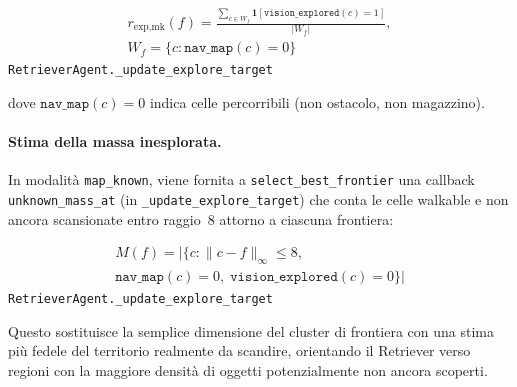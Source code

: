 \begin{multline*}
  r_{\text{exp,mk}}(f) = \frac{\sum_{c \in W_f} \mathbf{1}[\texttt{vision\_explored}(c) = 1]}{|W_f|},\\
  W_f = \{c : \texttt{nav\_map}(c) = 0\}
\end{multline*}
\noindent\hfill{\footnotesize\texttt{RetrieverAgent.\_update\_explore\_target}}

dove $\texttt{nav\_map}(c) = 0$ indica celle percorribili (non ostacolo,
non magazzino).

\begin{sloppypar}
\paragraph{Stima della massa inesplorata.}
In modalit\`a \texttt{map\_known}, viene fornita a
\texttt{select\_best\_fron\-tier}
una callback \texttt{unknown\_mass\_at} (in \texttt{\_update\_explore\_target})
che conta le celle walkable e non ancora
scansionate entro raggio~8 attorno a ciascuna frontiera:
\end{sloppypar}

\begin{multline*}
  M(f) = |\{c : \|c - f\|_\infty \leq 8,\\
  \texttt{nav\_map}(c) = 0,\; \texttt{vision\_explored}(c) = 0\}|
\end{multline*}
\noindent\hfill{\footnotesize\texttt{RetrieverAgent.\_update\_explore\_target}}

Questo sostituisce la semplice dimensione del cluster di frontiera con una stima
pi\`u fedele del territorio realmente da scandire, orientando il Retriever verso
regioni con la maggiore densit\`a di oggetti potenzialmente non ancora scoperti.
